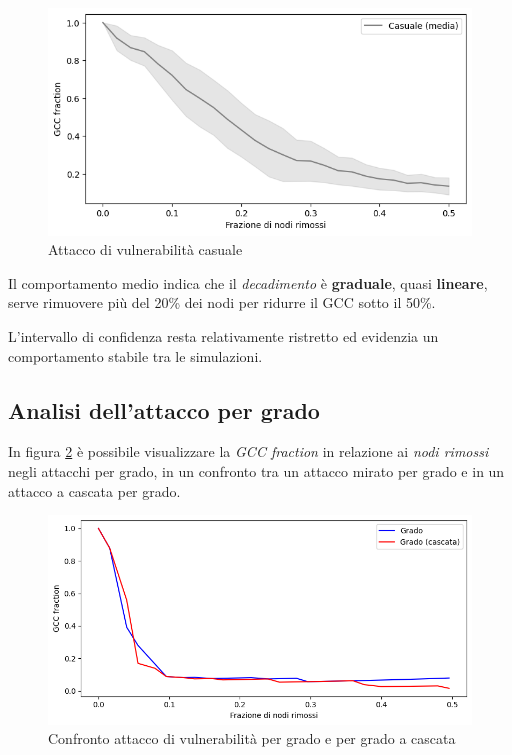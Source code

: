 \vspace{1em}
\begin{figure}[h!]
    \centering
    \includegraphics[width=0.8\linewidth]{Immagini//Capitoli//cap5/atk_random.png}
    \caption{Attacco di vulnerabilità casuale}
    \label{fig: Attacco di vulnerabilità casuale}
\end{figure}
\vspace{1em}

Il comportamento medio indica che il \textit{decadimento} è \textbf{graduale}, quasi \textbf{lineare}, serve rimuovere più del 20\% dei nodi per ridurre il GCC sotto il 50\%.

L'intervallo di confidenza resta relativamente ristretto ed evidenzia un comportamento stabile tra le simulazioni.

\subsection{Analisi dell'attacco per grado}
In figura \ref{fig: Confronto attacco di vulnerabilità per grado e per grado a cascata} è possibile visualizzare la \textit{GCC fraction} in relazione ai \textit{nodi rimossi} negli attacchi per grado, in un confronto tra un attacco mirato per grado e in un attacco a cascata per grado.

\vspace{1em}
\begin{figure}[ht!]
    \centering
    \includegraphics[width=0.8\linewidth]{Immagini//Capitoli//cap5/atk_degree_cfr.png}
    \caption{Confronto attacco di vulnerabilità per grado e per grado a cascata}
    \label{fig: Confronto attacco di vulnerabilità per grado e per grado a cascata}
\end{figure}
\vspace{1em}

